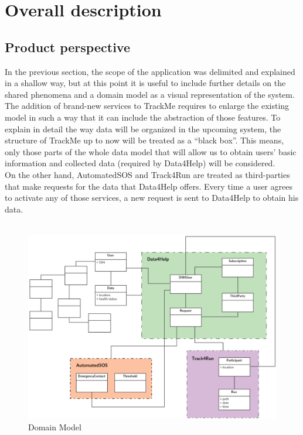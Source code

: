 \documentclass[12pt]{article}
\begin{document}
\section{Overall description}
\subsection{Product perspective}
In the previous section, the scope of the application was delimited and explained in a shallow way, but at this point it is useful to include further details on the shared phenomena and a domain model as a visual representation of the system.  \\

The addition of brand-new services to TrackMe requires to enlarge the existing model in such a way that it can include the abstraction of those features. To explain in detail the way data will be organized in the upcoming system, the structure of TrackMe up to now will be treated as a “black box”. This means, only those parts of the whole data model that will allow us to obtain users’ basic information and collected data (required by Data4Help) will be considered. \\

 On the other hand, AutomatedSOS and Track4Run are treated as third-parties that make requests for the data that Data4Help offers. Every time a user agrees to activate any of those services, a new request is sent to Data4Help to obtain his data. \\\\

 \begin{figure}[H]
\centering
 \includegraphics[scale=0.5]{Diagrams/domain_model.png}
\caption[Domain Model]{Domain Model}
\label{fig:Domain_model}
\end{figure}
\end{document}
